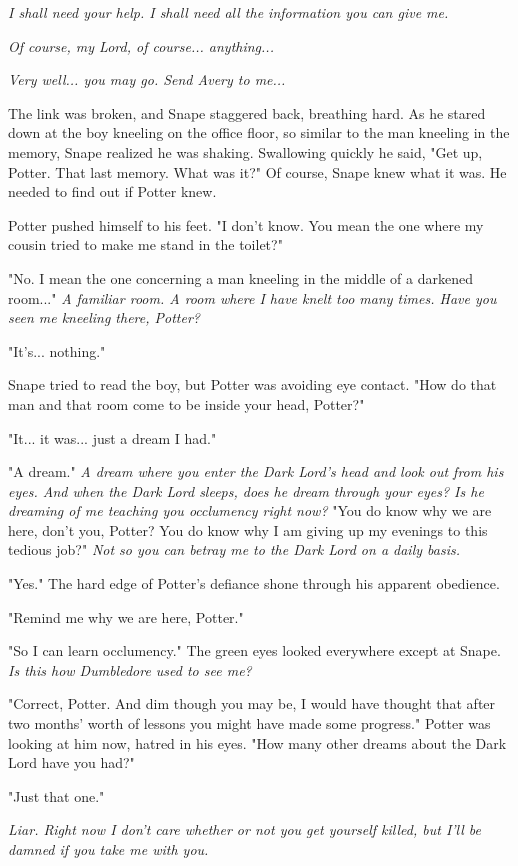 \documentclass[a4paper,11pt]{article}
\begin{document}
\emph{I shall need your help. I shall need all the information you can give me.}

\emph{Of course, my Lord, of course... anything...}

\emph{Very well... you may go. Send Avery to me...}

The link was broken, and Snape staggered back, breathing hard. As he stared down at the boy kneeling on the office floor, so similar to the man kneeling in the memory, Snape realized he was shaking. Swallowing quickly he said, "Get up, Potter. That last memory. What was it?" Of course, Snape knew what it was. He needed to find out if Potter knew.

Potter pushed himself to his feet. "I don't know. You mean the one where my cousin tried to make me stand in the toilet?"

"No. I mean the one concerning a man kneeling in the middle of a darkened room..." \emph{A familiar room. A room where I have knelt too many times. Have you seen me kneeling there, Potter?}

"It's... nothing."

Snape tried to read the boy, but Potter was avoiding eye contact. "How do that man and that room come to be inside your head, Potter?"

"It... it was... just a dream I had."

"A dream." \emph{A dream where you enter the Dark Lord's head and look out from his eyes. And when the Dark Lord sleeps, does he dream through your eyes? Is he dreaming of me teaching you occlumency right now?} "You do know why we are here, don't you, Potter? You do know why I am giving up my evenings to this tedious job?" \emph{Not so you can betray me to the Dark Lord on a daily basis.}

"Yes." The hard edge of Potter's defiance shone through his apparent obedience.

"Remind me why we are here, Potter."

"So I can learn occlumency." The green eyes looked everywhere except at Snape. \emph{Is this how Dumbledore used to see me?}

"Correct, Potter. And dim though you may be, I would have thought that after two months' worth of lessons you might have made some progress." Potter was looking at him now, hatred in his eyes. "How many other dreams about the Dark Lord have you had?"

"Just that one."

\emph{Liar. Right now I don't care whether or not you get yourself killed, but I'll be damned if you take me with you.}
\end{document}
